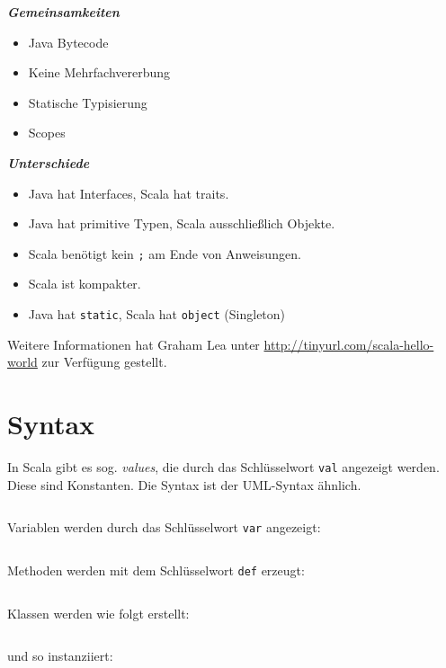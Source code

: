 \noindent\parbox[t]{2.4in}{\raggedright%
\textbf{\textit{Gemeinsamkeiten}}
\begin{itemize}[topsep=0pt,itemsep=-2pt,leftmargin=13pt]
    \item Java Bytecode
    \item Keine Mehrfachvererbung
    \item Statische Typisierung
    \item Scopes
\end{itemize}
}%
\parbox[t]{2.4in}{\raggedright%
\textbf{\textit{Unterschiede}}
\begin{itemize}[topsep=0pt,itemsep=-2pt,leftmargin=13pt]
    \item Java hat Interfaces, Scala hat traits.
    \item Java hat primitive Typen, Scala ausschließlich Objekte.
    \item Scala benötigt kein \texttt{;} am Ende von Anweisungen.
    \item Scala ist kompakter.
    \item Java hat \texttt{static}, Scala hat \texttt{object} (Singleton)
\end{itemize}
}

Weitere Informationen hat Graham Lea unter \url{http://tinyurl.com/scala-hello-world} zur Verfügung gestellt.

\section{Syntax}
In Scala gibt es sog. \textit{values}, die durch das Schlüsselwort \texttt{val}
angezeigt werden. Diese sind Konstanten. Die Syntax ist der UML-Syntax ähnlich.

\inputminted[numbersep=5pt, tabsize=4]{scala}{scripts/scala/val-syntax.scala}

Variablen werden durch das Schlüsselwort \texttt{var} angezeigt:

\inputminted[numbersep=5pt, tabsize=4]{scala}{scripts/scala/var-syntax.scala}

Methoden werden mit dem Schlüsselwort \texttt{def} erzeugt:

\inputminted[numbersep=5pt, tabsize=4]{scala}{scripts/scala/method-syntax.scala}

Klassen werden wie folgt erstellt:
\inputminted[numbersep=5pt, tabsize=4]{scala}{scripts/scala/simple-class-example.scala}

und so instanziiert:
\inputminted[numbersep=5pt, tabsize=4]{scala}{scripts/scala/simple-class-instanciation.scala}

